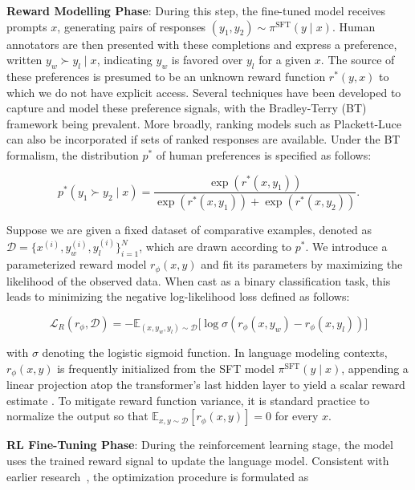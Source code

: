 \textbf{Reward Modelling Phase}: During this step, the fine-tuned model receives prompts $x$, generating pairs of responses $(y_1, y_2)\sim \pi^\text{SFT}(y \mid x)$. Human annotators are then presented with these completions and express a preference, written $y_w\succ y_l \mid x$, indicating $y_w$ is favored over $y_l$ for a given $x$. The source of these preferences is presumed to be an unknown reward function $r^*(y, x)$ to which we do not have explicit access. Several techniques have been developed to capture and model these preference signals, with the Bradley-Terry (BT) \cite{bradley1952rankanalysis} framework being prevalent. More broadly, ranking models such as Plackett-Luce \citep{plackett1975analysis, luce2012individual} can also be incorporated if sets of ranked responses are available. Under the BT formalism, the distribution $p^*$ of human preferences is specified as follows:

\begin{equation}\label{eq:bradley-terry}
    p^*(y_1\succ y_2 \mid x)=\frac{\exp\left(r^*(x, y_1)\right)}{\exp\left(r^*(x, y_1)\right) + \exp\left(r^*(x, y_2)\right)}.
\end{equation}

Suppose we are given a fixed dataset of comparative examples, denoted as $\mathcal{D}=\bigl\{x^{(i)}, y_w^{(i)}, y_l^{(i)}\bigr\}_{i=1}^N$, which are drawn according to $p^*$. We introduce a parameterized reward model $r_{\phi}(x, y)$ and fit its parameters by maximizing the likelihood of the observed data. When cast as a binary classification task, this leads to minimizing the negative log-likelihood loss defined as follows:

\begin{equation}\label{eq:reward_model}
    \mathcal{L}_R(r_{\phi}, \mathcal{D}) = -\mathbb{E}_{(x, y_w, y_l)\sim \mathcal{D}}\bigl[\log \sigma(r_{\phi}(x, y_w)- r_{\phi}(x, y_l))\bigr]
\end{equation}

with $\sigma$ denoting the logistic sigmoid function. In language modeling contexts, $r_{\phi}(x, y)$ is frequently initialized from the SFT model $\pi^\text{SFT}(y \mid x)$, appending a linear projection atop the transformer’s last hidden layer to yield a scalar reward estimate \cite{ziegler2020finetuning}. To mitigate reward function variance, it is standard practice to normalize the output so that $\mathbb{E}_{x,y\sim \mathcal{D}}\left[r_\phi(x, y)\right] = 0$ for every $x$.

\textbf{RL Fine-Tuning Phase}: During the reinforcement learning stage, the model uses the trained reward signal to update the language model. Consistent with earlier research~\citep{jaques2017sequence, jaques2020human}, the optimization procedure is formulated as

